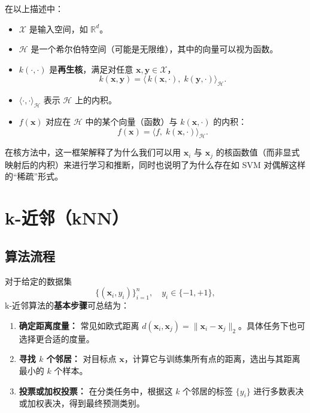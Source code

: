\documentclass[11pt]{article}
\begin{document}
\begin{CJK}{UTF8}{gbsn}
在以上描述中：
\begin{itemize}
    \item \(\mathcal{X}\) 是输入空间，如 \(\mathbb{R}^d\)。
    \item \(\mathcal{H}\) 是一个希尔伯特空间（可能是无限维），其中的向量可以视为函数。
    \item \(k(\cdot,\cdot)\) 是\textbf{再生核}，满足对任意 \(\mathbf{x}, \mathbf{y}\in\mathcal{X}\)，
    \[
    k(\mathbf{x}, \mathbf{y}) 
    = \langle\,k(\mathbf{x}, \cdot),\; k(\mathbf{y}, \cdot)\rangle_{\mathcal{H}}.
    \]
    \item \(\langle \cdot,\cdot\rangle_{\mathcal{H}}\) 表示 \(\mathcal{H}\) 上的内积。
    \item \(f(\mathbf{x})\) 对应在 \(\mathcal{H}\) 中的某个向量（函数）与 \(k(\mathbf{x},\cdot)\) 的内积：
    \[
    f(\mathbf{x}) 
    = \langle f, \; k(\mathbf{x}, \cdot)\rangle_{\mathcal{H}}.
    \]
\end{itemize}
在核方法中，这一框架解释了为什么我们可以用 \(\mathbf{x}_i\) 与 \(\mathbf{x}_j\) 的核函数值（而非显式映射后的内积）来进行学习和推断，同时也说明了为什么存在如 SVM 对偶解这样的“稀疏”形式。

\section{k-近邻（kNN）}

\subsection{算法流程}

对于给定的数据集 
\[
\{(\mathbf{x}_i, y_i)\}_{i=1}^n, \quad y_i \in \{-1, +1\},
\]
k-近邻算法的\textbf{基本步骤}可总结为：
\begin{enumerate}
    \item \textbf{确定距离度量：} 常见如欧式距离 \(d(\mathbf{x}_i, \mathbf{x}_j) = \|\mathbf{x}_i - \mathbf{x}_j\|_2\)。具体任务下也可选择更合适的度量。
    \item \textbf{寻找 \(k\) 个邻居：} 对目标点 \(\mathbf{x}\)，计算它与训练集所有点的距离，选出与其距离最小的 \(k\) 个样本。
    \item \textbf{投票或加权投票：} 在分类任务中，根据这 \(k\) 个邻居的标签 \(\{y_i\}\) 进行多数表决或加权表决，得到最终预测类别。
\end{enumerate}


\end{CJK}
\end{document}
